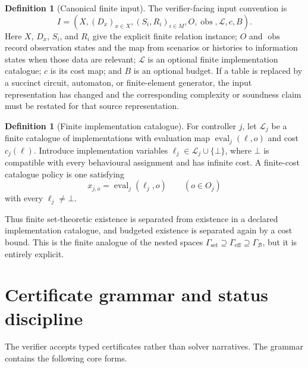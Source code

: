 \documentclass[11pt]{article}
\theoremstyle{plain}
\theoremstyle{definition}
\newtheorem{definition}[theorem]{Definition}
\theoremstyle{remark}
\newcommand{\GammaSet}{\Gamma_{\mathrm{set}}}
\newcommand{\GammaEff}{\Gamma_{\mathrm{eff}}}
\newcommand{\GammaB}{\Gamma_{\mathcal B}}
\begin{document}
\begin{definition}[Canonical finite input]
The verifier-facing input convention is
\[
I=(X,(D_x)_{x\in X},(S_i,R_i)_{i\in M},O,\operatorname{obs},
\mathcal L,c,B).
\]
Here \(X\), \(D_x\), \(S_i\), and \(R_i\) give the explicit finite relation
instance; \(O\) and \(\operatorname{obs}\) record observation states and the map
from scenarios or histories to information states when those data are relevant;
\(\mathcal L\) is an optional finite implementation catalogue; \(c\) is its cost
map; and \(B\) is an optional budget.  If a table is replaced by a succinct
circuit, automaton, or finite-element generator, the input representation has
changed and the corresponding complexity or soundness claim must be restated for
that source representation.
\end{definition}

\begin{definition}[Finite implementation catalogue]
For controller \(j\), let \(\mathcal L_j\) be a finite catalogue of
implementations with evaluation map \(\operatorname{eval}_j(\ell,o)\) and cost
\(c_j(\ell)\).  Introduce implementation variables
\(\ell_j\in\mathcal L_j\cup\{\bot\}\), where \(\bot\) is compatible with every
behavioural assignment and has infinite cost.  A finite-cost catalogue policy is
one satisfying
\[
  x_{j,o}=\operatorname{eval}_j(\ell_j,o)
  \qquad(o\in O_j)
\]
with every \(\ell_j\ne\bot\).
\end{definition}

Thus finite set-theoretic existence is separated from existence in a declared
implementation catalogue, and budgeted existence is separated again by a cost
bound.  This is the finite analogue of the nested spaces
\(\GammaSet\supseteq\GammaEff\supseteq\GammaB\), but it is entirely explicit.

\section{Certificate grammar and status discipline}
\label{sec:certificates}

The verifier accepts typed certificates rather than solver narratives.  The
grammar contains the following core forms.
\end{document}
